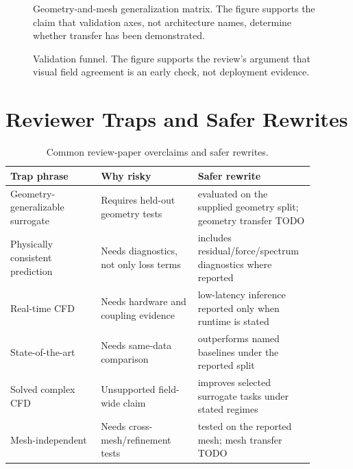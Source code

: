 \documentclass[11pt]{article}
\begin{document}
\begin{figure}[t]
\centering
{}
\caption{Geometry-and-mesh generalization matrix. The figure supports the claim that validation axes, not architecture names, determine whether transfer has been demonstrated.}
\end{figure}

\begin{figure}[t]
\centering
{}
\caption{Validation funnel. The figure supports the review's argument that visual field agreement is an early check, not deployment evidence.}
\end{figure}

\section{Reviewer Traps and Safer Rewrites}
\begin{table}[t]
\centering
\caption{Common review-paper overclaims and safer rewrites.}
\begin{tabular}{p{0.28\linewidth}p{0.30\linewidth}p{0.30\linewidth}}
\toprule
Trap phrase & Why risky & Safer rewrite \\
\midrule
Geometry-generalizable surrogate & Requires held-out geometry tests & evaluated on the supplied geometry split; geometry transfer TODO \\
Physically consistent prediction & Needs diagnostics, not only loss terms & includes residual/force/spectrum diagnostics where reported \\
Real-time CFD & Needs hardware and coupling evidence & low-latency inference reported only when runtime is stated \\
State-of-the-art & Needs same-data comparison & outperforms named baselines under the reported split \\
Solved complex CFD & Unsupported field-wide claim & improves selected surrogate tasks under stated regimes \\
Mesh-independent & Needs cross-mesh/refinement tests & tested on the reported mesh; mesh transfer TODO \\
\bottomrule
\end{tabular}
\end{table}
\end{document}
